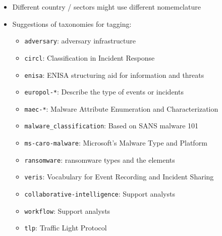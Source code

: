 \begin{frame}
    \begin{itemize}
        \item Different country / sectors might use different nomemclature
        \item Suggestions of taxonomies for tagging:
        \begin{itemize}
            \item \texttt{adversary}: adversary infrastructure
            \item \texttt{circl}: Classification in Incident Response
            \item \texttt{enisa}: ENISA structuring aid for information and threats
            \item \texttt{europol-*}: Describe the type of events or incidents
            \item \texttt{maec-*}: Malware Attribute Enumeration and Characterization
            \item \texttt{malware\_classification}: Based on SANS malware 101
            \item \texttt{ms-caro-malware}: Microsoft’s Malware Type and Platform
            \item \texttt{ransomware}: ransomware types and the elements
            \item \texttt{veris}: Vocabulary for Event Recording and Incident Sharing 
            \item \texttt{collaborative-intelligence}: Support analysts
            \item \texttt{workflow}: Support analysts
            \item \texttt{tlp}: Traffic Light Protocol 
        \end{itemize}
    \end{itemize}
\end{frame}


